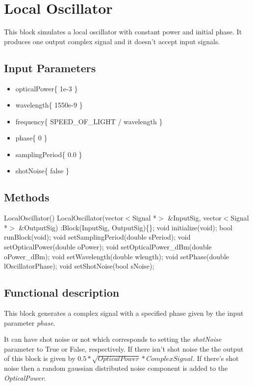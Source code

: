 \clearpage

\section{Local Oscillator}

This block simulates a local oscillator with constant power and initial phase. It produces one output complex signal and it doesn't accept input signals.

\subsection*{Input Parameters}

\begin{itemize}
	\item opticalPower\{ 1e-3 \}
	\item wavelength\{ 1550e-9 \}
	\item frequency\{ SPEED\_OF\_LIGHT / wavelength \}
	\item phase\{ 0 \}
	\item samplingPeriod\{ 0.0 \}
	\item shotNoise\{ false \}
\end{itemize}

\subsection*{Methods}

LocalOscillator() {}
\bigbreak
LocalOscillator(vector$<$Signal *$>$ \&InputSig, vector$<$Signal *$>$ \&OutputSig) :Block(InputSig, OutputSig)\{\};
\bigbreak
void initialize(void);
\bigbreak
bool runBlock(void);
\bigbreak
void setSamplingPeriod(double sPeriod);
\bigbreak
void setOpticalPower(double oPower);
\bigbreak
void setOpticalPower\_dBm(double oPower\_dBm);
\bigbreak
void setWavelength(double wlength);
\bigbreak
void setPhase(double lOscillatorPhase);
\bigbreak
void setShotNoise(bool sNoise);

\subsection*{Functional description}

This block generates a complex signal with a specified phase given by the input parameter \textit{phase}.

It can have shot noise or not which corresponds to setting the \textit{shotNoise} parameter to True or False, respectively. If there isn't shot noise the the output of this block is given by $0.5*\sqrt{OpticalPower}*ComplexSignal$. If there's shot noise then a random gaussian distributed noise component is added to the \textit{OpticalPower}.

